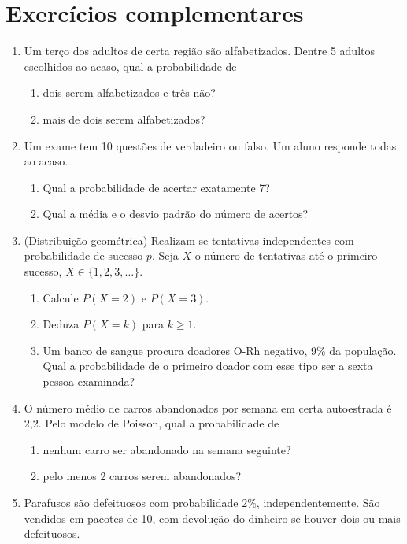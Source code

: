 \documentclass[11pt]{article}
\begin{document}
\bigskip
\section*{Exercícios complementares}

\begin{enumerate}[label=\textbf{C\arabic*.}, leftmargin=*]
\item Um terço dos adultos de certa região são alfabetizados. Dentre 5 adultos escolhidos ao acaso, qual a probabilidade de
\begin{enumerate}[label=(\alph*)]
  \item dois serem alfabetizados e três não?
  \item mais de dois serem alfabetizados?
\end{enumerate}
\item Um exame tem 10 questões de verdadeiro ou falso. Um aluno responde todas ao acaso.
\begin{enumerate}[label=(\alph*)]
  \item Qual a probabilidade de acertar exatamente 7?
  \item Qual a média e o desvio padrão do número de acertos?
\end{enumerate}
\item (Distribuição geométrica) Realizam-se tentativas independentes com probabilidade de sucesso $p$. Seja $X$ o número de tentativas até o primeiro sucesso, $X \in \{1, 2, 3, \ldots\}$.
\begin{enumerate}[label=(\alph*)]
  \item Calcule $P(X = 2)$ e $P(X = 3)$.
  \item Deduza $P(X = k)$ para $k \geq 1$.
  \item Um banco de sangue procura doadores O-Rh negativo, 9\% da população. Qual a probabilidade de o primeiro doador com esse tipo ser a sexta pessoa examinada?
\end{enumerate}
\item O número médio de carros abandonados por semana em certa autoestrada é 2,2. Pelo modelo de Poisson, qual a probabilidade de
\begin{enumerate}[label=(\alph*)]
  \item nenhum carro ser abandonado na semana seguinte?
  \item pelo menos 2 carros serem abandonados?
\end{enumerate}
\item Parafusos são defeituosos com probabilidade 2\%, independentemente. São vendidos em pacotes de 10, com devolução do dinheiro se houver dois ou mais defeituosos.

\end{enumerate}
\end{document}
